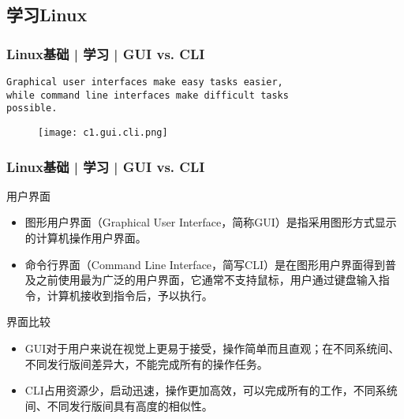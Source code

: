 \subsection{学习Linux}
\begin{frame}[fragile]
  \frametitle{Linux基础 | 学习 | GUI vs. CLI}
  \begin{verbatim}
Graphical user interfaces make easy tasks easier,
while command line interfaces make difficult tasks
possible.
  \end{verbatim}
  \vspace{-0.8cm}
  \begin{figure}
    \centering
    \texttt{[image: c1.gui.cli.png]}
  \end{figure}
\end{frame}

\begin{frame}
  \frametitle{Linux基础 | 学习 | GUI vs. CLI}
  \begin{block}{\alert{用户界面}}
    \begin{itemize}[<+->]
      \item 图形用户界面（Graphical User Interface，简称GUI）是指采用图形方式显示的计算机操作用户界面。
      \item 命令行界面（Command Line Interface，简写CLI）是在图形用户界面得到普及之前使用最为广泛的用户界面，它通常不支持鼠标，用户通过键盘输入指令，计算机接收到指令后，予以执行。
    \end{itemize}
  \end{block}
  \pause
  \begin{block}{界面比较}
    \begin{itemize}
      \item GUI对于用户来说在视觉上更易于接受，操作简单而且直观；在不同系统间、不同发行版间差异大，不能完成所有的操作任务。
      \item CLI占用资源少，启动迅速，操作更加高效，可以完成所有的工作，不同系统间、不同发行版间具有高度的相似性。
    \end{itemize}
  \end{block}
  \pause
\end{frame}

